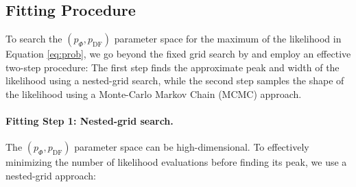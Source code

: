 \subsection{Fitting Procedure} \label{sec:fitting}

To search the $(p_\Phi,p_\text{DF})$ parameter space for the maximum of the likelihood in Equation \ref{eq:prob}, we go beyond the fixed grid search by \citet{bov13} and employ an effective two-step procedure: The first step finds the approximate peak and width of the likelihood using a nested-grid search, while the second step samples the shape of the likelihood using a Monte-Carlo Markov Chain (MCMC) approach.

\paragraph{Fitting Step 1: Nested-grid search.} The $(p_\Phi,p_\text{DF})$ parameter space can be high-dimensional. To effectively minimizing the number of likelihood evaluations before finding its peak, we use a nested-grid approach:
